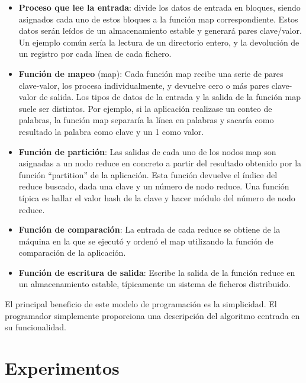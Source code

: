 \documentclass[runningheads]{llncs}
\begin{document}
\begin{itemize}
 \item \textbf{Proceso que lee la entrada}: divide los datos de entrada en bloques, siendo asignados cada uno de estos bloques a la 
 función map correspondiente. Estos datos serán leídos de un almacenamiento estable y generará pares clave/valor. 
 Un ejemplo común sería la lectura de un directorio entero, y la devolución de un registro por cada línea de cada fichero.

 \item \textbf{Función de mapeo} (map): Cada función map recibe una serie de pares clave-valor, los procesa individualmente, y 
 devuelve cero o más pares clave-valor de salida. Los tipos de datos de la entrada y la salida de la función map suele ser
distintos. Por ejemplo, si la aplicación realizase un conteo de palabras, la función map separaría la línea en palabras y 
sacaría como resultado la palabra como clave y un 1 como valor.
 
 \item \textbf{Función de partición}: Las salidas de cada uno de los nodos map son asignadas a un nodo reduce en concreto a 
 partir del resultado obtenido por la función ``partition'' de la aplicación. Esta función devuelve el índice del reduce buscado, 
 dada una clave y un número de nodo reduce. Una función típica es hallar el valor hash de la clave y hacer módulo del número 
 de nodo reduce.

 \item \textbf{Función de comparación}: La entrada de cada reduce se obtiene de la máquina en la que se ejecutó y ordenó el 
 map utilizando la función de comparación de la aplicación.

 \item \textbf{Función de escritura de salida}: Escribe la salida de la función reduce en un almacenamiento estable, típicamente 
 un sistema de ficheros distribuido.
 
\end{itemize}

El principal beneficio de este modelo de programación es la simplicidad. El programador simplemente proporciona una descripción 
del algoritmo centrada en su funcionalidad.





\section{Experimentos}
\end{document}
